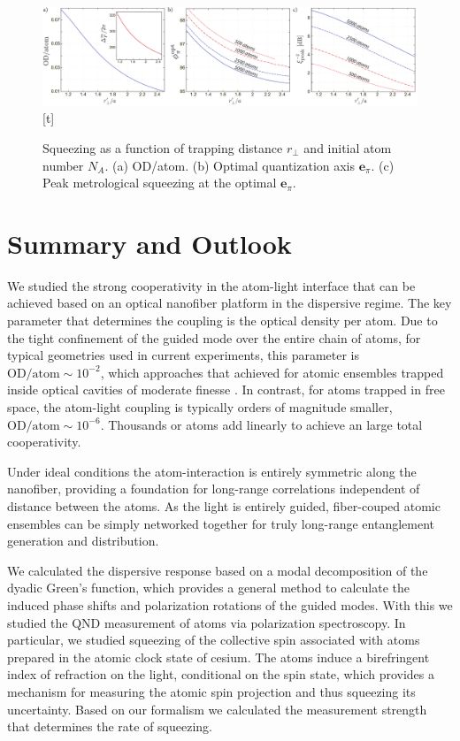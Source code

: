 \documentclass[preprint, aps,pra,onecolumn]{revtex4-1} %
\newcommand{\qaxis}{\mathbf{e}_\pi}
\begin{document}
\begin{figure}\includegraphics[scale=0.4]{./Figs/Fig_SqueezingDistance}[t]
\caption{Squeezing as a function of trapping distance $r_\perp$ and initial atom number $N_A$. (a) OD/atom. (b) Optimal quantization axis $\qaxis$. 
(c) Peak metrological squeezing at the optimal $\qaxis$.} \label{Fig::Squeezing_Distance}
\end{figure}


\section{Summary and Outlook}

We studied the strong cooperativity in the atom-light interface that can be achieved based on an optical nanofiber platform in the dispersive regime.  
The key parameter that determines the coupling is the optical density per atom.  
Due to the tight confinement of the guided mode over the entire chain of atoms, for typical geometries used in current experiments, this parameter is $ \mathrm{OD}/\mathrm{atom}\sim 10^{-2} $, which approaches that achieved for atomic ensembles trapped inside optical cavities of moderate finesse \cite{chen_conditional_2011, zhang_collective_2012}.  
In contrast, for atoms trapped in free space, the atom-light coupling is typically orders of magnitude smaller, $ \mathrm{OD}/\mathrm{atom} \sim 10^{-6}$.  Thousands or atoms add linearly to achieve an large total cooperativity.

Under ideal conditions the atom-interaction is entirely symmetric along the nanofiber, providing a foundation for long-range correlations independent of distance between the atoms. 
As the light is entirely guided, fiber-couped atomic ensembles can be simply networked together for truly long-range entanglement generation and distribution. 

We calculated the dispersive response based on a modal decomposition of the dyadic Green's function, which provides a general method to calculate the induced phase shifts and polarization rotations of the guided modes. 
With this we studied the QND measurement of atoms via polarization spectroscopy. 
In particular, we studied squeezing of the collective spin associated with atoms prepared in the atomic clock state of cesium. 
The atoms induce a birefringent index of refraction on the light, conditional on the spin state, which provides a mechanism for measuring the atomic spin projection and thus squeezing its uncertainty.  
Based on our formalism we calculated the measurement strength that determines the rate of squeezing.  
\end{document}
